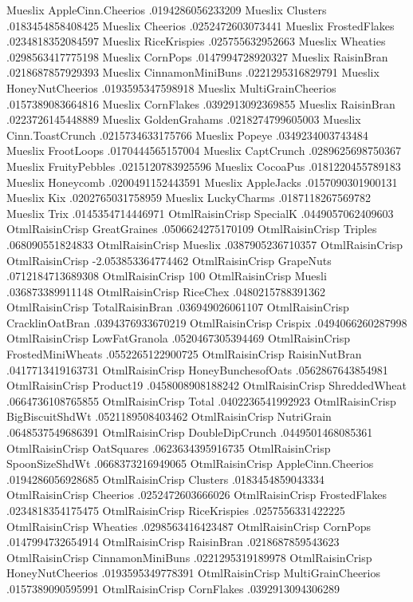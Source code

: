 Mueslix	AppleCinn.Cheerios	.0194286056233209
Mueslix	Clusters	.0183454858408425
Mueslix	Cheerios	.0252472603073441
Mueslix	FrostedFlakes	.0234818352084597
Mueslix	RiceKrispies	.025755632952663
Mueslix	Wheaties	.0298563417775198
Mueslix	CornPops	.0147994728920327
Mueslix	RaisinBran	.0218687857929393
Mueslix	CinnamonMiniBuns	.0221295316829791
Mueslix	HoneyNutCheerios	.0193595347598918
Mueslix	MultiGrainCheerios	.0157389083664816
Mueslix	CornFlakes	.0392913092369855
Mueslix	RaisinBran	.0223726145448889
Mueslix	GoldenGrahams	.0218274799605003
Mueslix	Cinn.ToastCrunch	.0215734633175766
Mueslix	Popeye	.0349234003743484
Mueslix	FrootLoops	.0170444565157004
Mueslix	CaptCrunch	.0289625698750367
Mueslix	FruityPebbles	.0215120783925596
Mueslix	CocoaPus	.0181220455789183
Mueslix	Honeycomb	.0200491152443591
Mueslix	AppleJacks	.0157090301900131
Mueslix	Kix	.0202765031758959
Mueslix	LuckyCharms	.0187118267569782
Mueslix	Trix	.0145354714446971
OtmlRaisinCrisp	SpecialK	.0449057062409603
OtmlRaisinCrisp	GreatGraines	.0506624275170109
OtmlRaisinCrisp	Triples	.068090551824833
OtmlRaisinCrisp	Mueslix	.0387905236710357
OtmlRaisinCrisp	OtmlRaisinCrisp	-2.053853364774462
OtmlRaisinCrisp	GrapeNuts	.0712184713689308
OtmlRaisinCrisp	100%
OtmlRaisinCrisp	Muesli	.036873389911148
OtmlRaisinCrisp	RiceChex	.0480215788391362
OtmlRaisinCrisp	TotalRaisinBran	.036949026061107
OtmlRaisinCrisp	CracklinOatBran	.0394376933670219
OtmlRaisinCrisp	Crispix	.0494066260287998
OtmlRaisinCrisp	LowFatGranola	.0520467305394469
OtmlRaisinCrisp	FrostedMiniWheats	.0552265122900725
OtmlRaisinCrisp	RaisinNutBran	.0417713419163731
OtmlRaisinCrisp	HoneyBunchesofOats	.0562867643854981
OtmlRaisinCrisp	Product19	.0458008908188242
OtmlRaisinCrisp	ShreddedWheat	.0664736108765855
OtmlRaisinCrisp	Total	.0402236541992923
OtmlRaisinCrisp	BigBiscuitShdWt	.0521189508403462
OtmlRaisinCrisp	NutriGrain	.0648537549686391
OtmlRaisinCrisp	DoubleDipCrunch	.0449501468085361
OtmlRaisinCrisp	OatSquares	.0623634395916735
OtmlRaisinCrisp	SpoonSizeShdWt	.0668373216949065
OtmlRaisinCrisp	AppleCinn.Cheerios	.0194286056928685
OtmlRaisinCrisp	Clusters	.0183454859043334
OtmlRaisinCrisp	Cheerios	.0252472603666026
OtmlRaisinCrisp	FrostedFlakes	.0234818354175475
OtmlRaisinCrisp	RiceKrispies	.0257556331422225
OtmlRaisinCrisp	Wheaties	.0298563416423487
OtmlRaisinCrisp	CornPops	.0147994732654914
OtmlRaisinCrisp	RaisinBran	.0218687859543623
OtmlRaisinCrisp	CinnamonMiniBuns	.0221295319189978
OtmlRaisinCrisp	HoneyNutCheerios	.0193595349778391
OtmlRaisinCrisp	MultiGrainCheerios	.0157389090595991
OtmlRaisinCrisp	CornFlakes	.0392913094306289
